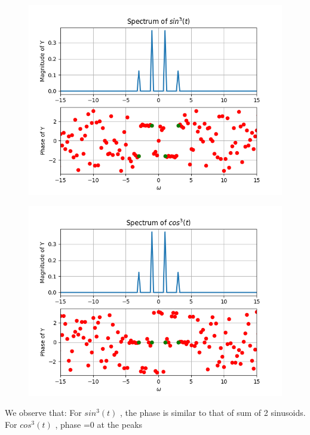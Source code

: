 \documentclass[11pt, a4paper]{article}
\begin{document}
\begin{figure}[!tbh]
\centering
\includegraphics[scale=0.75]{assgn9_plot5.png} 
\label{fig5}
\end{figure} 

\begin{figure}[!tbh]
\centering
\includegraphics[scale=0.8]{assgn9_plot6.png} 
\label{fig6}
\end{figure} 
We observe that:
\newline
For $sin^3(t)$ , the phase is similar to that of sum of 2 sinusoids.
\newline
For $cos^3(t)$ , phase =0 at the peaks
\end{document}
